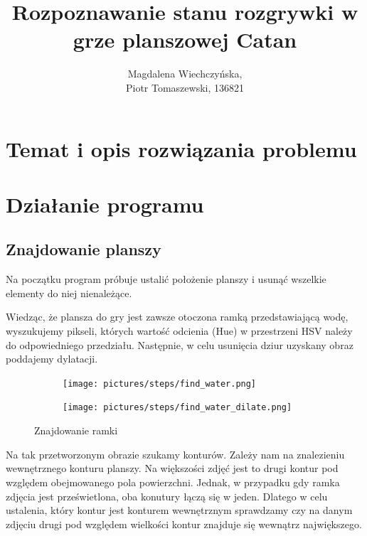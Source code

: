 \documentclass[a4paper]{article}
\title{Rozpoznawanie stanu rozgrywki w grze planszowej Catan}
\author{Magdalena Wiechczyńska, \\
Piotr Tomaszewski, 136821}
\date{} %
\begin{document}
\maketitle

\section{Temat i opis rozwiązania problemu}

\section{Działanie programu}
    \subsection{Znajdowanie planszy}
    Na początku program próbuje ustalić położenie planszy i usunąć wszelkie elementy do niej nienależące.

    Wiedząc, że plansza do gry jest zawsze otoczona ramką przedstawiającą wodę, wyszukujemy pikseli, których wartość odcienia (Hue) w przestrzeni HSV należy do odpowiedniego przedziału. Następnie, w celu usunięcia dziur uzyskany obraz poddajemy dylatacji.
    \begin{figure}[h]
        \centering
        \begin{subfigure}[t]{.3\linewidth}
        \texttt{[image: pictures/steps/find\_water.png]}
        \end{subfigure}
        \begin{subfigure}[t]{.3\linewidth}
        \texttt{[image: pictures/steps/find\_water\_dilate.png]}
        \end{subfigure}

        \caption{Znajdowanie ramki}
        \label{fig:step1}
    \end{figure}

    Na tak przetworzonym obrazie szukamy konturów. Zależy nam na znalezieniu wewnętrznego konturu planszy. Na większości zdjęć jest to drugi kontur pod względem obejmowanego pola powierzchni. Jednak, w przypadku gdy ramka zdjęcia jest prześwietlona, oba konutury łączą się w jeden. Dlatego w celu ustalenia, który kontur jest konturem wewnętrznym sprawdzamy czy na danym zdjęciu drugi pod względem wielkości kontur znajduje się wewnątrz największego.
\end{document}
